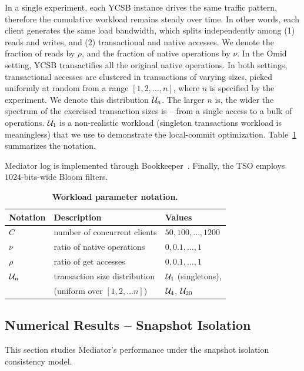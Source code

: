 In a single experiment, each YCSB instance drives the same traffic pattern, therefore the cumulative 
workload remains steady over time. In other words, each client generates the same load bandwidth, 
which splits independently among (1) reads and writes, and (2) transactional and native accesses. 
We denote the fraction of reads by $\rho$, and the fraction of native operations by $\nu$. 
In the Omid setting, YCSB transactifies all the original native operations. In both settings, 
transactional accesses are clustered in transactions of varying sizes, picked 
uniformly at random from a range $[1, 2, \ldots, n]$, where $n$ is specified by the 
experiment. We denote this distribution $\mathcal{U}_{n}$. The larger $n$ is, the wider the spectrum 
of the exercised transaction sizes is -- from a single access to a bulk of operations. 
$\mathcal{U}_{1}$ is a non-realistic workload (singleton transactions workload is
meaningless) that we use to demonstrate the local-commit optimization. Table~\ref{tab:notation} 
summarizes the notation. 

Mediator log is implemented through Bookkeeper~\cite{Bookkeeper2013}. 
Finally, the TSO employs $1024$-bits-wide Bloom filters.

\setlength{\belowcaptionskip}{0pt}
\setlength{\abovecaptionskip}{6pt}
\begin{table} [t]
\small{
\begin{tabular}{lll}
{\bf Notation} & {\bf Description} & {\bf Values} \\
\hline
$C$ & number of concurrent clients & $50, 100, \ldots, 1200$ \\
$\nu$ & ratio of native operations & $0, 0.1, \ldots, 1$ \\
$\rho$ & ratio of get accesses & $0, 0.1, \ldots, 1$  \\
$\mathcal{U}_{n}$ & transaction size distribution & $\mathcal{U}_{1}$ (singletons), \\
& (uniform over $[1, 2, \ldots n]$) & $\mathcal{U}_{4}$, $\mathcal{U}_{20}$
\end{tabular}
}
\caption{\bf{\small{Workload parameter notation.}}}
\label{tab:notation}
\end{table}

\subsection{Numerical Results -- Snapshot Isolation}
\label{sec:tests:si}

This section studies Mediator's performance under the snapshot isolation consistency model. 

